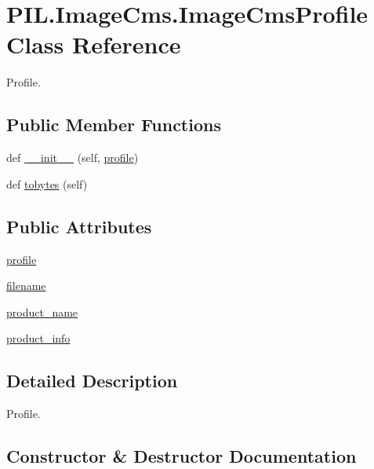 \hypertarget{classPIL_1_1ImageCms_1_1ImageCmsProfile}{}\section{P\+I\+L.\+Image\+Cms.\+Image\+Cms\+Profile Class Reference}
\label{classPIL_1_1ImageCms_1_1ImageCmsProfile}


Profile.  


\subsection*{Public Member Functions}
\begin{DoxyCompactItemize}
\item 
def \hyperlink{classPIL_1_1ImageCms_1_1ImageCmsProfile_ab55f692691019ffe3942b6ba2243e960}{\+\_\+\+\_\+init\+\_\+\+\_\+} (self, \hyperlink{classPIL_1_1ImageCms_1_1ImageCmsProfile_a5718c64eb78cb7292727d7973ddc71b3}{profile})
\item 
def \hyperlink{classPIL_1_1ImageCms_1_1ImageCmsProfile_a160c9e47af83f3ebde1fad8a21fce31c}{tobytes} (self)
\end{DoxyCompactItemize}
\subsection*{Public Attributes}
\begin{DoxyCompactItemize}
\item 
\hyperlink{classPIL_1_1ImageCms_1_1ImageCmsProfile_a5718c64eb78cb7292727d7973ddc71b3}{profile}
\item 
\hyperlink{classPIL_1_1ImageCms_1_1ImageCmsProfile_aaede2f1acabc6ace55b12378ed622170}{filename}
\item 
\hyperlink{classPIL_1_1ImageCms_1_1ImageCmsProfile_ae857fe9fe5932449970e424b10fbdca4}{product\+\_\+name}
\item 
\hyperlink{classPIL_1_1ImageCms_1_1ImageCmsProfile_aae71a3a0641973d4a50cc45a2b0d2acc}{product\+\_\+info}
\end{DoxyCompactItemize}


\subsection{Detailed Description}
Profile. 



\subsection{Constructor \& Destructor Documentation}
\mbox{\label{classPIL_1_1ImageCms_1_1ImageCmsProfile_ab55f692691019ffe3942b6ba2243e960}} 
